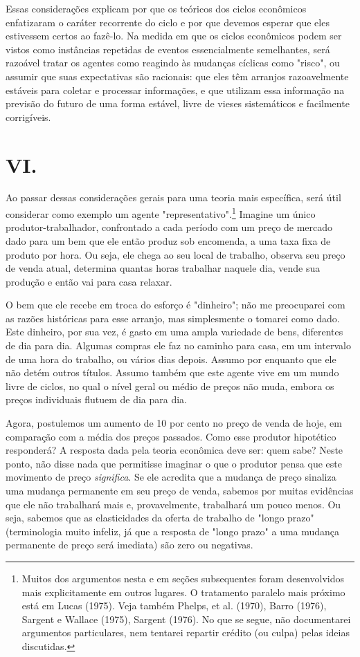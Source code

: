 \documentclass[12pt]{article}
\begin{document}
Essas considerações explicam por que os teóricos dos ciclos econômicos enfatizaram o caráter recorrente do ciclo e por que devemos esperar que eles estivessem certos ao fazê-lo. Na medida em que os ciclos econômicos podem ser vistos como instâncias repetidas de eventos essencialmente semelhantes, será razoável tratar os agentes como reagindo às mudanças cíclicas como "risco", ou assumir que suas expectativas são racionais: que eles têm arranjos razoavelmente estáveis para coletar e processar informações, e que utilizam essa informação na previsão do futuro de uma forma estável, livre de vieses sistemáticos e facilmente corrigíveis.

\section*{VI.}

Ao passar dessas considerações gerais para uma teoria mais específica, será útil considerar como exemplo um agente "representativo".\footnote{Muitos dos argumentos nesta e em seções subsequentes foram desenvolvidos mais explicitamente em outros lugares. O tratamento paralelo mais próximo está em Lucas (1975). Veja também Phelps, et al. (1970), Barro (1976), Sargent e Wallace (1975), Sargent (1976). No que se segue, não documentarei argumentos particulares, nem tentarei repartir crédito (ou culpa) pelas ideias discutidas.} Imagine um único produtor-trabalhador, confrontado a cada período com um preço de mercado dado para um bem que ele então produz sob encomenda, a uma taxa fixa de produto por hora. Ou seja, ele chega ao seu local de trabalho, observa seu preço de venda atual, determina quantas horas trabalhar naquele dia, vende sua produção e então vai para casa relaxar.

O bem que ele recebe em troca do esforço é "dinheiro"; não me preocuparei com as razões históricas para esse arranjo, mas simplesmente o tomarei como dado. Este dinheiro, por sua vez, é gasto em uma ampla variedade de bens, diferentes de dia para dia. Algumas compras ele faz no caminho para casa, em um intervalo de uma hora do trabalho, ou vários dias depois. Assumo por enquanto que ele não detém outros títulos. Assumo também que este agente vive em um mundo livre de ciclos, no qual o nível geral ou médio de preços não muda, embora os preços individuais flutuem de dia para dia.

Agora, postulemos um aumento de 10 por cento no preço de venda de hoje, em comparação com a média dos preços passados. Como esse produtor hipotético responderá? A resposta dada pela teoria econômica deve ser: quem sabe? Neste ponto, não disse nada que permitisse imaginar o que o produtor pensa que este movimento de preço \textit{significa}. Se ele acredita que a mudança de preço sinaliza uma mudança permanente em seu preço de venda, sabemos por muitas evidências que ele não trabalhará mais e, provavelmente, trabalhará um pouco menos. Ou seja, sabemos que as elasticidades da oferta de trabalho de "longo prazo" (terminologia muito infeliz, já que a resposta de "longo prazo" a uma mudança permanente de preço será imediata) são zero ou negativas.
\end{document}
